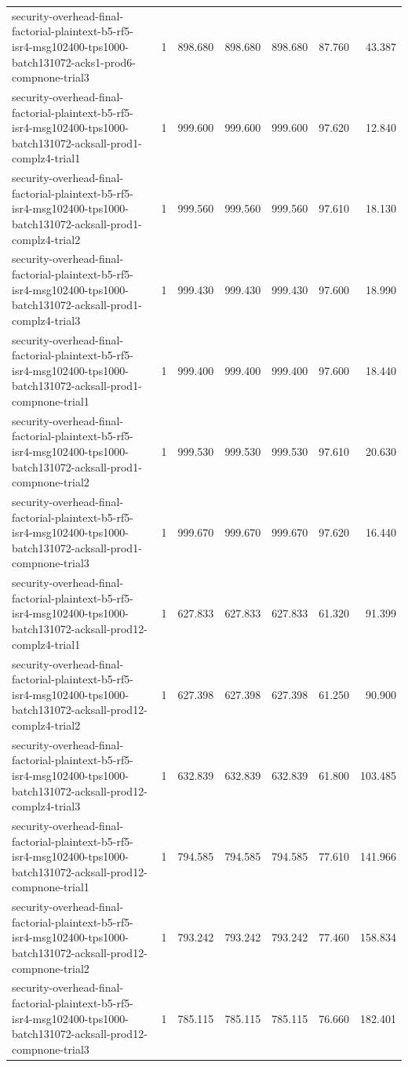 \begin{tabular}{lrrrrrr}
security-overhead-final-factorial-plaintext-b5-rf5-isr4-msg102400-tps1000-batch131072-acks1-prod6-compnone-trial3 & 1 & 898.680 & 898.680 & 898.680 & 87.760 & 43.387 \\
security-overhead-final-factorial-plaintext-b5-rf5-isr4-msg102400-tps1000-batch131072-acksall-prod1-complz4-trial1 & 1 & 999.600 & 999.600 & 999.600 & 97.620 & 12.840 \\
security-overhead-final-factorial-plaintext-b5-rf5-isr4-msg102400-tps1000-batch131072-acksall-prod1-complz4-trial2 & 1 & 999.560 & 999.560 & 999.560 & 97.610 & 18.130 \\
security-overhead-final-factorial-plaintext-b5-rf5-isr4-msg102400-tps1000-batch131072-acksall-prod1-complz4-trial3 & 1 & 999.430 & 999.430 & 999.430 & 97.600 & 18.990 \\
security-overhead-final-factorial-plaintext-b5-rf5-isr4-msg102400-tps1000-batch131072-acksall-prod1-compnone-trial1 & 1 & 999.400 & 999.400 & 999.400 & 97.600 & 18.440 \\
security-overhead-final-factorial-plaintext-b5-rf5-isr4-msg102400-tps1000-batch131072-acksall-prod1-compnone-trial2 & 1 & 999.530 & 999.530 & 999.530 & 97.610 & 20.630 \\
security-overhead-final-factorial-plaintext-b5-rf5-isr4-msg102400-tps1000-batch131072-acksall-prod1-compnone-trial3 & 1 & 999.670 & 999.670 & 999.670 & 97.620 & 16.440 \\
security-overhead-final-factorial-plaintext-b5-rf5-isr4-msg102400-tps1000-batch131072-acksall-prod12-complz4-trial1 & 1 & 627.833 & 627.833 & 627.833 & 61.320 & 91.399 \\
security-overhead-final-factorial-plaintext-b5-rf5-isr4-msg102400-tps1000-batch131072-acksall-prod12-complz4-trial2 & 1 & 627.398 & 627.398 & 627.398 & 61.250 & 90.900 \\
security-overhead-final-factorial-plaintext-b5-rf5-isr4-msg102400-tps1000-batch131072-acksall-prod12-complz4-trial3 & 1 & 632.839 & 632.839 & 632.839 & 61.800 & 103.485 \\
security-overhead-final-factorial-plaintext-b5-rf5-isr4-msg102400-tps1000-batch131072-acksall-prod12-compnone-trial1 & 1 & 794.585 & 794.585 & 794.585 & 77.610 & 141.966 \\
security-overhead-final-factorial-plaintext-b5-rf5-isr4-msg102400-tps1000-batch131072-acksall-prod12-compnone-trial2 & 1 & 793.242 & 793.242 & 793.242 & 77.460 & 158.834 \\
security-overhead-final-factorial-plaintext-b5-rf5-isr4-msg102400-tps1000-batch131072-acksall-prod12-compnone-trial3 & 1 & 785.115 & 785.115 & 785.115 & 76.660 & 182.401 \\

\end{tabular}
